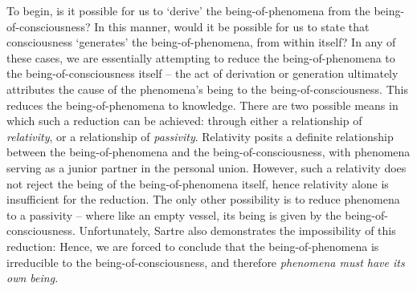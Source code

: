 To begin, is it possible for us to \enquote*{derive} the being-of-phenomena from the being-of-consciousness? In this manner, would it be possible for us to state that consciousness \enquote*{generates} the being-of-phenomena, from within itself? In any of these cases, we are essentially attempting to reduce the being-of-phenomena to the being-of-consciousness itself -- the act of derivation or generation ultimately attributes the cause of the phenomena's being to the being-of-consciousness. This reduces the being-of-phenomena to knowledge. There are two possible means in which such a reduction can be achieved: through either a relationship of \emph{relativity}, or a relationship of \emph{passivity}. Relativity posits a definite relationship between the being-of-phenomena and the being-of-consciousness, with phenomena serving as a junior partner in the personal union. However, such a relativity does not reject the being of the being-of-phenomena itself, hence relativity alone is insufficient for the reduction.  The only other possibility is to reduce phenomena to a passivity -- where like an empty vessel, its being is given by the being-of-consciousness. Unfortunately, Sartre also demonstrates the impossibility of this reduction:  Hence, we are forced to conclude that the being-of-phenomena is irreducible to the being-of-consciousness, and therefore \emph{phenomena must have its own being.}





